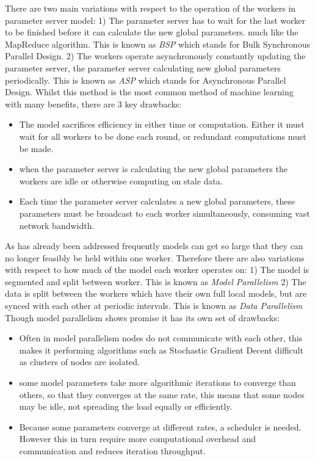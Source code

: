 There are two main variations with respect to the operation of the workers in
parameter server model: 1) The parameter server has to wait for the last worker
to be finished before it can calculate the new global parameters. much like the
MapReduce algorithm. \cite{googlemapreduce2008} This is known as \textit{BSP}
which stands for Bulk Synchronous Parallel Design.  2) The workers operate
asynchronously constantly updating the parameter server, the parameter server
calculating new global parameters periodically. \cite{Qirong2013SSP} This is known as
\textit{ASP} which stands for Asynchronous Parallel Design. Whilst this
method is the most common method of machine learning with many benefits, there
are 3 key drawbacks:
\begin{itemize}
    \item The model sacrifices efficiency in either time or computation. Either
    it must wait for all workers to be done each round, or redundant
    computations must be made. \cite{Chilimbi2014ADAM}
    \item when the parameter server is calculating the new global parameters the
    workers are idle or otherwise computing on stale data. 
    \cite{Verbraeken2020MLSurvey}
    \item Each time the parameter server calculates a new global parameters,
    these parameters must be broadcast to each worker simultaneously, consuming
    vast network bandwidth. \cite{LI2014ParameterServers}
\end{itemize}

As has already been addressed frequently models can get so large that they can
no longer feasibly be held within one worker. Therefore there are also
variations with respect to how much of the model each worker operates on: 1) The
model is segmented and split between worker. This is known as \textit{Model
Parallelism} 2) The data is split between the workers which have their own full
local models, but are synced with each other at periodic intervals. This is
known as \textit{Data Parallelism} \cite{Xing2015Petuum} Though model
parallelism shows promise it has its own set of drawbacks:
\begin{itemize}
    \item Often in model parallelism nodes do not communicate with each other,
    this makes it performing algorithms such as Stochastic Gradient Decent
    difficult as clusters of nodes are isolated.
    \item some model parameters take more algorithmic iterations to converge
    than others, so that they converges at the same rate, this means that some
    nodes may be idle, not spreading the load equally or efficiently.
    \cite{Dean2012Distbelief}
    \item Because some parameters converge at different rates, a scheduler is
    needed. However this in turn require more computational overhead and
    communication and reduces iteration throughput. \cite{kim2016STRADS}
\end{itemize}
\par

